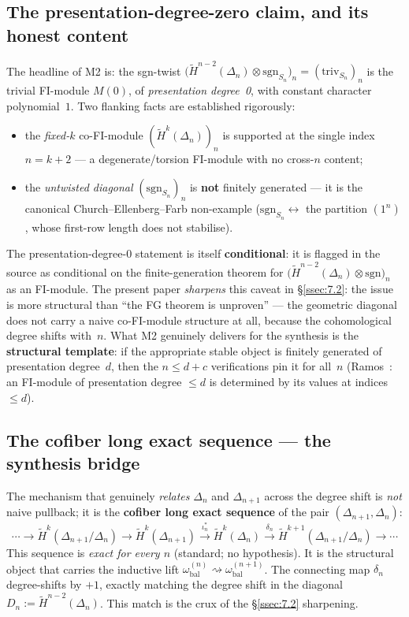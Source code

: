 \documentclass[11pt,reqno]{amsart}
\theoremstyle{plain}
\theoremstyle{definition}
\newcommand{\Hred}{\widetilde H}
\newcommand{\sgn}{\mathrm{sgn}}
\newcommand{\triv}{\mathrm{triv}}
\newcommand{\omegabal}[1]{\omega_{\mathrm{bal}}^{(#1)}}
\begin{document}
\subsection{The presentation-degree-zero claim, and its honest content}\label{ssec:4.2}
The headline of M2 is: the sgn-twist
$\bigl(\Hred^{n-2}(\Delta_n)\otimes\sgn_{S_n}\bigr)_n=(\triv_{S_n})_n$
is the trivial FI-module $M(0)$, of \emph{presentation degree~0}, with
constant character polynomial~$1$. Two flanking facts are established
rigorously:
\begin{itemize}[leftmargin=1.6em]
  \item the \emph{fixed-$k$} co-FI-module $(\Hred^k(\Delta_n))_n$ is
        supported at the single index $n=k+2$ --- a degenerate/torsion
        FI-module with no cross-$n$ content;
  \item the \emph{untwisted diagonal} $(\sgn_{S_n})_n$ is \textbf{not}
        finitely generated --- it is the canonical
        Church--Ellenberg--Farb non-example
        ($\sgn_{S_n}\leftrightarrow$ the partition $(1^n)$, whose
        first-row length does not stabilise).
\end{itemize}
The presentation-degree-$0$ statement is itself \textbf{conditional}: it
is flagged in the source as conditional on the finite-generation theorem
for $\bigl(\Hred^{n-2}(\Delta_n)\otimes\sgn\bigr)_n$ as an FI-module.
The present paper \emph{sharpens} this caveat in \S\ref{ssec:7.2}: the
issue is more structural than ``the FG theorem is unproven'' --- the
geometric diagonal does not carry a naive co-FI-module structure at all,
because the cohomological degree shifts with~$n$. What M2 genuinely
delivers for the synthesis is the \textbf{structural template}: if the
appropriate stable object is finitely generated of presentation
degree~$d$, then the $n\le d+c$ verifications pin it for all~$n$
(Ramos~\cite{Ramos2017}: an FI-module of presentation degree $\le d$ is
determined by its values at indices $\le d$).

\subsection{The cofiber long exact sequence --- the synthesis bridge}\label{ssec:4.3}
The mechanism that genuinely \emph{relates} $\Delta_n$ and
$\Delta_{n+1}$ across the degree shift is \emph{not} naive pullback; it
is the \textbf{cofiber long exact sequence} of the pair
$(\Delta_{n+1},\Delta_n)$:
\[
  \cdots\to\Hred^k(\Delta_{n+1}/\Delta_n)
        \to\Hred^k(\Delta_{n+1})
        \xrightarrow{\ \iota_n^*\ }\Hred^k(\Delta_n)
        \xrightarrow{\ \delta_n\ }\Hred^{k+1}(\Delta_{n+1}/\Delta_n)
        \to\cdots
\]
This sequence is \emph{exact for every $n$} (standard; no hypothesis).
It is the structural object that carries the inductive lift
$\omegabal n\rightsquigarrow\omegabal{n+1}$. The connecting map
$\delta_n$ degree-shifts by $+1$, exactly matching the degree shift in
the diagonal $D_n:=\Hred^{n-2}(\Delta_n)$. This match is the crux of the
\S\ref{ssec:7.2} sharpening.
\end{document}

